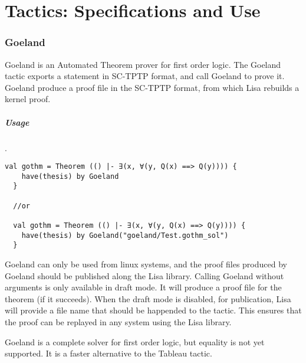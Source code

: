 \chapter{Tactics: Specifications and Use}
\label{chapt:tactics}

\subsection*{Goeland}
Goeland\cite{DBLP:conf/cade/CaillerRDRB22} is an Automated Theorem prover for first order logic. The Goeland tactic exports a statement in SC-TPTP format, and call Goeland to prove it. Goeland produce a proof file in the SC-TPTP format, from which Lisa rebuilds a kernel proof.
\paragraph*{Usage}.
\newline\begin{lstlisting}[language=lisa, frame=single]
  val gothm = Theorem (() |- ∃(x, ∀(y, Q(x) ==> Q(y)))) {
    have(thesis) by Goeland
  }

  //or

  val gothm = Theorem (() |- ∃(x, ∀(y, Q(x) ==> Q(y)))) {
    have(thesis) by Goeland("goeland/Test.gothm_sol")
  }
\end{lstlisting}
Goeland can only be used from linux systems, and the proof files produced by Goeland should be published along the Lisa library. Calling Goeland without arguments is only available in draft mode. It will produce a proof file for the theorem (if it succeeds). When the draft mode is disabled, for publication, Lisa will provide a file name that should be happended to the tactic. This ensures that the proof can be replayed in any system using the Lisa library.

Goeland is a complete solver for first order logic, but equality is not yet supported. It is a faster alternative to the Tableau tactic.